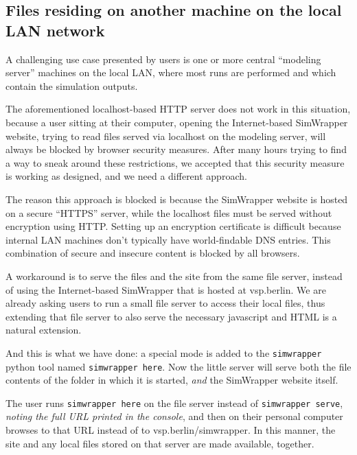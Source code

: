 \hypertarget{files-residing-on-another-machine-on-the-local-lan-network}{%
\subsection{Files residing on another machine on the local LAN
network}\label{files-residing-on-another-machine-on-the-local-lan-network}}

A challenging use case presented by users is one or more central
``modeling server'' machines on the local LAN, where most runs are
performed and which contain the simulation outputs.

The aforementioned localhost-based HTTP server does not work in this
situation, because a user sitting at their computer, opening the
Internet-based SimWrapper website, trying to read files served via
localhost on the modeling server, will always be blocked by browser
security measures. After many hours trying to find a way to sneak around
these restrictions, we accepted that this security measure is working as
designed, and we need a different approach.

The reason this approach is blocked is because the SimWrapper website is
hosted on a secure ``HTTPS'' server, while the localhost files must be
served without encryption using HTTP. Setting up an encryption
certificate is difficult because internal LAN machines don't typically
have world-findable DNS entries. This combination of secure and insecure
content is blocked by all browsers.

A workaround is to serve the files and the site from the same file
server, instead of using the Internet-based SimWrapper that is hosted at
vsp.berlin. We are already asking users to run a small file server to
access their local files, thus extending that file server to also serve
the necessary javascript and HTML is a natural extension.

And this is what we have done: a special mode is added to the
\texttt{simwrapper} python tool named \texttt{simwrapper\ here}. Now the
little server will serve both the file contents of the folder in which
it is started, \emph{and} the SimWrapper website itself.

The user runs \texttt{simwrapper\ here} on the file server instead of
\texttt{simwrapper\ serve}, \emph{noting the full URL printed in the
console}, and then on their personal computer browses to that URL
instead of to vsp.berlin/simwrapper. In this manner, the site and any
local files stored on that server are made available, together.

